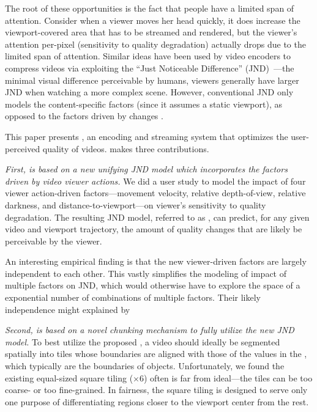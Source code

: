 The root of these opportunities is the fact that people have a limited span of attention.
Consider when a viewer moves her head quickly, it does increase the viewport-covered area that has to be streamed and rendered, but the viewer's attention per-pixel (\ie sensitivity to quality degradation) actually drops due to the limited span of attention.
Similar ideas have been used by video encoders to compress videos via exploiting the ``Just Noticeable Difference'' (JND)~\cite{??,??,??}---the minimal visual difference perceivable by humans, \eg viewers generally have larger JND when watching a more complex scene. 
However, conventional JND only models the content-specific factors (since it assumes a static viewport), as opposed to the factors driven by changes . 

This paper presents {\em \name}, an encoding and streaming system that optimizes the user-perceived quality of \vr videos. 
\name makes three contributions.

\vspace{0.2cm}
{\em First, \name is based on a new unifying JND model which incorporates the factors driven by \vr video viewer actions.}
We did a user study to model the impact of four viewer action-driven factors---movement velocity, relative depth-of-view, relative darkness, and distance-to-viewport---on viewer's sensitivity to quality degradation.
The resulting JND model, referred to as {\em \vrjnd}, can predict, for any given video and viewport trajectory, the amount of quality changes  that are likely be perceivable by the viewer.

An interesting empirical finding is that the new viewer-driven factors are largely independent to each other.
This vastly simplifies the modeling of impact of multiple factors on JND, which would otherwise have to explore the space of a exponential number of combinations of multiple factors.
Their likely independence might explained by 


\vspace{0.2cm}
{\em Second, \name is based on a novel chunking mechanism to fully utilize the new JND model.}
To best utilize the proposed \vrjnd,  a video should ideally be segmented spatially into tiles whose boundaries are aligned with those of the values in the \vrjnd, which typically are the boundaries of objects.
Unfortunately, we found the existing equal-sized square tiling ($\times$6) often is far from ideal---the tiles can be too coarse- or too fine-grained. 
In fairness, the square tiling is designed to serve only one purpose of differentiating regions closer to the viewport center from the rest.

